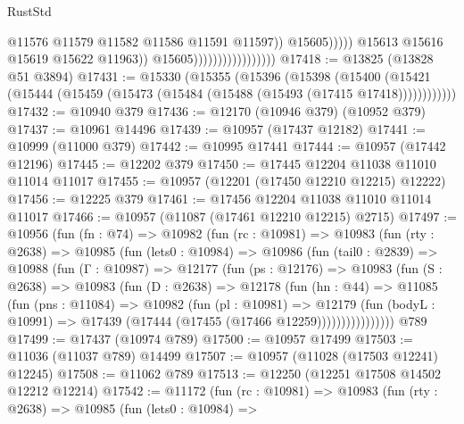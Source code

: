 \begin{lexlean}{RustStd}
\begin{coremodule}
                                                        @11576
                                                        @11579
                                                        @11582
                                                        @11586
                                                        @11591
                                                        @11597))
                                                    @15605)))))
                                          @15613
                                          @15616
                                          @15619
                                          @15622
                                          @11963))
                                      @15605)))))))))))))))))
@17418 := @13825 (@13828 @51 @3894)
@17431 := @15330
    (@15355
      (@15396
        (@15398
          (@15400 (@15421 (@15444 (@15459 (@15473 (@15484 (@15488 (@15493 (@17415 @17418))))))))))))
@17432 := @10940 @379
@17436 := @12170 (@10946 @379) (@10952 @379)
@17437 := @10961 @14496
@17439 := @10957 (@17437 @12182)
@17441 := @10999 (@11000 @379)
@17442 := @10995 @17441
@17444 := @10957 (@17442 @12196)
@17445 := @12202 @379
@17450 := @17445 @12204 @11038 @11010 @11014 @11017
@17455 := @10957 (@12201 (@17450 @12210 @12215) @12222)
@17456 := @12225 @379
@17461 := @17456 @12204 @11038 @11010 @11014 @11017
@17466 := @10957 (@11087 (@17461 @12210 @12215) @2715)
@17497 := @10956
    (fun (fn : @74) =>
    @10982
      (fun (rc : @10981) =>
      @10983
        (fun (rty : @2638) =>
        @10985
          (fun (lets0 : @10984) =>
          @10986
            (fun (tail0 : @2839) =>
            @10988
              (fun (Γ : @10987) =>
              @12177
                (fun (ps : @12176) =>
                @10983
                  (fun (S : @2638) =>
                  @10983
                    (fun (D : @2638) =>
                    @12178
                      (fun (hn : @44) =>
                      @11085
                        (fun (pns : @11084) =>
                        @10982
                          (fun (pl : @10981) =>
                          @12179
                            (fun (bodyL : @10991) =>
                            @17439 (@17444 (@17455 (@17466 @12259))))))))))))))))
    @789
@17499 := @17437 (@10974 @789)
@17500 := @10957 @17499
@17503 := @11036 (@11037 @789) @14499
@17507 := @10957 (@11028 (@17503 @12241) @12245)
@17508 := @11062 @789
@17513 := @12250 (@12251 @17508 @14502 @12212 @12214)
@17542 := @11172
    (fun (rc : @10981) =>
    @10983
      (fun (rty : @2638) =>
      @10985
        (fun (lets0 : @10984) =>

\end{coremodule}
\end{lexlean}
